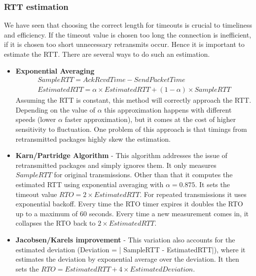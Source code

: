 \subsubsection{RTT estimation}
We have seen that choosing the correct length for timeouts is crucial to timeliness and efficiency. If the timeout value is chosen too long the connection is inefficient, if it is chosen too short unnecessary retransmits occur. Hence it is important to estimate the RTT. There are several ways to do such an estimation.
\begin{itemize}
\item \textbf{Exponential Averaging} 
\begin{align*}
SampleRTT = AckRcvdTime - SendPacketTime \\
EstimatedRTT = \alpha \times EstimatedRTT + (1-\alpha) \times SampleRTT
\end{align*}
Assuming the RTT is constant, this method will correctly approach the RTT. Depending on the value of $\alpha$ this approximation happens with different speeds (lower $\alpha$ faster approximation), but it comes at the cost of higher sensitivity to fluctuation. One problem of this approach is that timings from retransmitted packages highly skew the estimation.
\item \textbf{Karn/Partridge Algorithm} - This algorithm addresses the issue of retransmitted packages and simply ignores them. It only measures $SampleRTT$ for original transmissions. Other than that it computes the estimated RTT using exponential averaging with $\alpha = 0.875$. It sets the timeout value $RTO = 2 \times EstimatedRTT$. For repeated transmissions it uses exponential backoff. Every time the RTO timer expires it doubles the RTO up to a maximum of 60 seconds. Every time a new measurement comes in, it collapses the RTO back to $2 \times EstimatedRTT$.
\item \textbf{Jacobsen/Karels improvement} - This variation also accounts for the estimated deviation (Deviation = | SampleRTT - EstimatedRTT|), where it estimates the deviation by exponential average over the deviation. It then sets the $RTO = EstimatedRTT + 4 \times EstimatedDeviation$.
\end{itemize}

